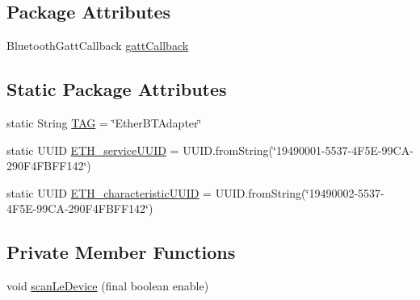 \subsection*{Package Attributes}
\begin{DoxyCompactItemize}
\item 
Bluetooth\+Gatt\+Callback \mbox{\hyperlink{classcom_1_1ethernom_1_1android_1_1etherapi_1_1link_layer_1_1_ether_b_t_adapter_a17059d94c028813915ae16fda6284ec9}{gatt\+Callback}}
\end{DoxyCompactItemize}
\subsection*{Static Package Attributes}
\begin{DoxyCompactItemize}
\item 
static String \mbox{\hyperlink{classcom_1_1ethernom_1_1android_1_1etherapi_1_1link_layer_1_1_ether_b_t_adapter_acc66cd1a480350b141b85f4224b74c90}{T\+AG}} = \char`\"{}Ether\+B\+T\+Adapter\char`\"{}
\item 
static U\+U\+ID \mbox{\hyperlink{classcom_1_1ethernom_1_1android_1_1etherapi_1_1link_layer_1_1_ether_b_t_adapter_a0af7a7f9d02b088e91fac54d74034b6e}{E\+T\+H\+\_\+service\+U\+U\+ID}} = U\+U\+I\+D.\+from\+String(\char`\"{}19490001-\/5537-\/4\+F5\+E-\/99\+C\+A-\/290\+F4\+F\+B\+F\+F142\char`\"{})
\item 
static U\+U\+ID \mbox{\hyperlink{classcom_1_1ethernom_1_1android_1_1etherapi_1_1link_layer_1_1_ether_b_t_adapter_aa6a060920f2be335e5508467f498b90d}{E\+T\+H\+\_\+characteristic\+U\+U\+ID}} = U\+U\+I\+D.\+from\+String(\char`\"{}19490002-\/5537-\/4\+F5\+E-\/99\+C\+A-\/290\+F4\+F\+B\+F\+F142\char`\"{})
\end{DoxyCompactItemize}
\subsection*{Private Member Functions}
\begin{DoxyCompactItemize}
\item 
void \mbox{\hyperlink{classcom_1_1ethernom_1_1android_1_1etherapi_1_1link_layer_1_1_ether_b_t_adapter_ae18b937682f5cd4e06ffa8efd1d17b46}{scan\+Le\+Device}} (final boolean enable)
\end{DoxyCompactItemize}
